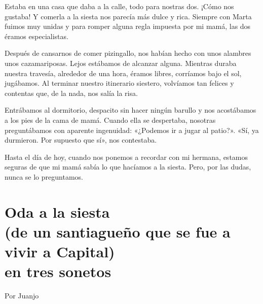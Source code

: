 \documentclass[11pt,twoside,openright,a5paper]{book}
\begin{document}
Estaba en una casa que daba a la calle, todo para nostras dos. ¡Cómo nos gustaba! Y comerla a la siesta nos parecía más dulce y rica. Siempre con Marta fuimos muy unidas y para romper alguna regla impuesta por mi mamá, las dos éramos especialistas.

Después de cansarnos de comer pizingallo, nos habían hecho con  unos alambres unos cazamariposas. Lejos estábamos de alcanzar alguna. Mientras duraba nuestra travesía, alrededor de una hora, éramos libres, corríamos bajo el sol, jugábamos. Al terminar nuestro itinerario siestero, volvíamos tan felices y contentas que, de la nada, nos salía la risa.

Entrábamos al dormitorio, despacito sin hacer ningún barullo y nos acostábamos a los pies de la cama de mamá. Cuando ella se despertaba, nosotras preguntábamos con aparente ingenuidad: «¿Podemos ir a jugar al patio?». «Sí, ya durmieron. Por supuesto que sí», nos contestaba.

Hasta el día de hoy, cuando nos ponemos a recordar con mi hermana, estamos seguras de que mi mamá sabía lo que hacíamos a la siesta. Pero, por las dudas, nunca se lo preguntamos.

\section*{Oda a la siesta\\(de un santiagueño que se fue a vivir a Capital)\\
 en tres sonetos}

\begin{flushright}Por Juanjo\end{flushright}
\end{document}

